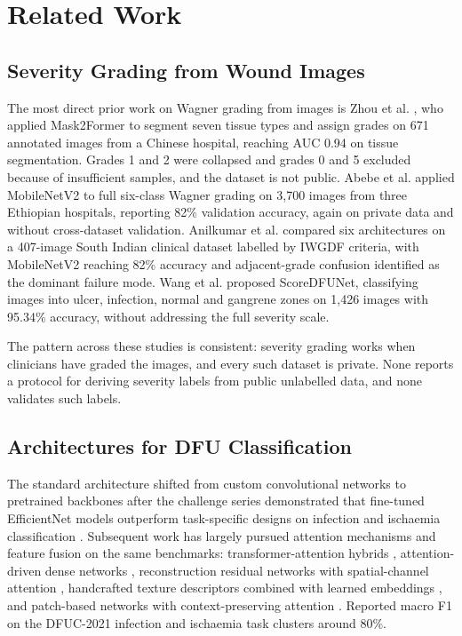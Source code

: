 \section{Related Work}

\subsection{Severity Grading from Wound Images}

The most direct prior work on Wagner grading from images is Zhou et al.
\cite{zhou2025}, who applied Mask2Former to segment seven tissue types and
assign grades on 671 annotated images from a Chinese hospital, reaching AUC
0.94 on tissue segmentation. Grades 1 and 2 were collapsed and grades 0 and
5 excluded because of insufficient samples, and the dataset is not public.
Abebe et al. \cite{abebe2025} applied MobileNetV2 to full six-class Wagner
grading on 3{,}700 images from three Ethiopian hospitals, reporting 82\%
validation accuracy, again on private data and without cross-dataset
validation. Anilkumar et al. \cite{anilkumar2026} compared six
architectures on a 407-image South Indian clinical dataset labelled by
IWGDF criteria, with MobileNetV2 reaching 82\% accuracy and adjacent-grade
confusion identified as the dominant failure mode. Wang et al.
\cite{wang2024score} proposed ScoreDFUNet, classifying images into ulcer,
infection, normal and gangrene zones on 1{,}426 images with 95.34\%
accuracy, without addressing the full severity scale.

The pattern across these studies is consistent: severity grading works when
clinicians have graded the images, and every such dataset is private. None
reports a protocol for deriving severity labels from public unlabelled
data, and none validates such labels.

\subsection{Architectures for DFU Classification}

The standard architecture shifted from custom convolutional networks to
pretrained backbones after the challenge series demonstrated that
fine-tuned EfficientNet models outperform task-specific designs on
infection and ischaemia classification \cite{liu2022}. Subsequent work has largely
pursued attention mechanisms and feature fusion on the same benchmarks:
transformer-attention hybrids \cite{karthik2025}, attention-driven dense networks
, reconstruction residual networks with spatial-channel attention
\cite{wang2024farr}, handcrafted texture descriptors combined with learned embeddings
\cite{algaraawi2022}, and patch-based networks with context-preserving attention \cite{liu2021}.
Reported macro F1 on the DFUC-2021 infection and ischaemia task
clusters around 80\%.

